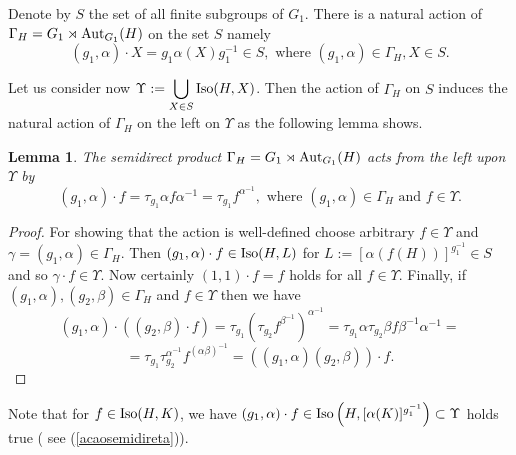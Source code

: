 \documentclass[a4paper,12pt]{article}
\newtheorem{lem}[thm]{Lemma}
\def\aut {{\rm Aut}}
\def\Iso {{\rm Iso}}
\begin{document}
{Denote by $S$ the set of all finite subgroups of $G_1$. There is a natural action of $\Gamma_{H}=G_1\rtimes \aut_{G_1}(H)$ on the set $S$ namely \begin{equation} \label{acaoemX} (g_1,\alpha)\cdot X= g_1\alpha(X)g_1^{-1} \in S, \mbox{ where } (g_1,\alpha) \in \Gamma_H, X \in S. \end{equation}
 
 
 Let us  consider now
$\Upsilon :=\displaystyle\bigcup_{X\in S} \Iso(H,X)$.  Then  the action of $\Gamma_H$ on $S$ induces the natural action
of  $\Gamma_H$  on the left on $\Upsilon$ as the following lemma shows.

\begin{lem}\label{elementary}
The semidirect product  $\Gamma_{H}=G_1 \rtimes \aut_{G_1}(H)$
acts from the left upon $\Upsilon$ by
\begin{equation} \label{acaosemidireta} (g_1,\alpha) \cdot f=\tau_{g_1} \alpha f \alpha^{-1} = \tau_{g_1} f^{\alpha^{-1}}, \mbox{ where } (g_1,\alpha) \in \Gamma_H \mbox{ 
 and } f \in \Upsilon.
 \end{equation}
\end{lem}
\begin{proof} For showing that the action is well-defined choose arbitrary $f\in \Upsilon$ and $\gamma=(g_1,\alpha)\in \Gamma_{H}$. Then $(g_1,\alpha) \cdot f \in \Iso(H, L)$ for $L:=\left[ \alpha(f(H))\right]^{g_1^{-1}} \in S$ and so $\gamma \cdot f \in \Upsilon$. Now certainly $(1,1)\cdot f=f$ holds for all $f\in \Upsilon$. Finally, if  $(g_1,\alpha), (g_2,\beta) \in \Gamma_H$ and $f \in \Upsilon$ then we have $$(g_1,\alpha) \cdot ((g_2,\beta) \cdot f)=\tau_{g_1}(\tau_{g_2} f^{\beta^{-1}})^{\alpha^{-1}}=\tau_{g_1}\alpha\tau_{g_2}\beta f \beta^{-1}\alpha^{-1}=$$ $$=\tau_{g_1}\tau_{g_2}^{\alpha^{-1}}f^{(\alpha\beta)^{-1}}=((g_1,\alpha)(g_2,\beta)) \cdot f.$$
\end{proof}





 Note that for $f\in \Iso(H, K)$, we have $(g_1,\alpha) \cdot f \in \Iso\left(H, [\alpha(K)]^{g_1^{-1}}\right) \subset \Upsilon$ holds true ( see (\ref{acaosemidireta})).  


}
\end{document}
